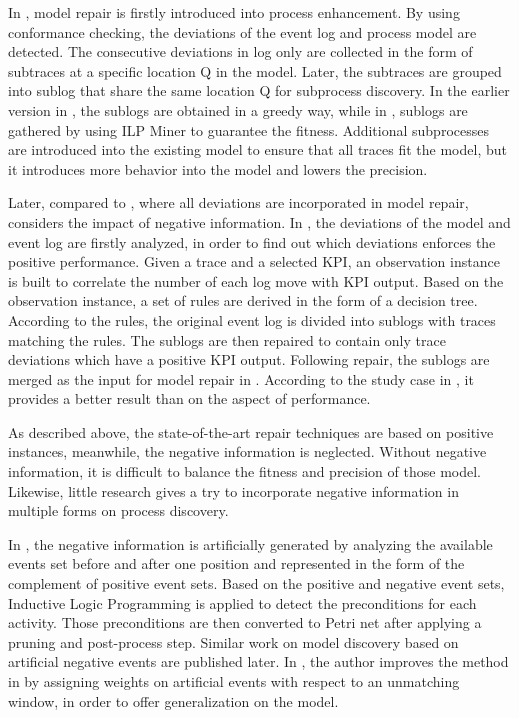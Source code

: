 In \cite{fahland2012repairing}, model repair is firstly introduced into process enhancement. By using conformance checking, the deviations of the event log and process model are detected. The consecutive deviations in log only are collected in the form of subtraces at a specific location Q in the model. Later, the subtraces are grouped into sublog that share the same location Q for subprocess discovery. In the earlier version in \cite{fahland2012repairing}, the sublogs are obtained in a greedy way, while in \cite{fahland2015model}, sublogs are gathered by using ILP Miner to guarantee the fitness. Additional subprocesses are introduced into the existing model to ensure that all traces fit the model, but it introduces more behavior into the model and lowers the precision.

Later, compared to \cite{fahland2012repairing, fahland2015model}, where all deviations are incorporated in model repair, \cite{dees2017enhancing} considers the impact of negative information.  In \cite{dees2017enhancing}, the deviations of the model and event log are firstly analyzed, in order to find out which deviations enforces the positive performance. Given a trace and a selected KPI, an observation instance is built to correlate the number of each log move with KPI output. Based on the observation instance,  a set of rules are derived in the form of a decision tree. According to the rules, the original event log is divided into sublogs with traces matching the rules. The sublogs are then repaired to contain only trace deviations which have a positive KPI output. Following repair, the sublogs are merged as the input for model repair in \cite{fahland2015model}. According to the study case in \cite{dees2017enhancing}, it provides a better result than \cite{fahland2015model} on the aspect of performance. 
 
As described above, the state-of-the-art repair techniques are based on positive instances, meanwhile, the negative information is neglected. Without negative information, it is difficult to balance the fitness and precision of those model. Likewise, little research gives a try to incorporate negative information in multiple forms on process discovery.

In \cite{goedertier2009robust}, the negative information is artificially generated by analyzing the available events set before and after one position and represented in the form of the complement of positive event sets. Based on the positive and negative event sets, Inductive Logic Programming is applied to detect the preconditions for each activity. Those preconditions are then converted to Petri net after applying a pruning and post-process step. Similar work on model discovery based on artificial negative events are published later. In \cite{vanden2014determining}, the author improves the method in \cite{goedertier2009robust} by assigning weights on artificial events with respect to an unmatching window, in order to offer generalization on the model. 

